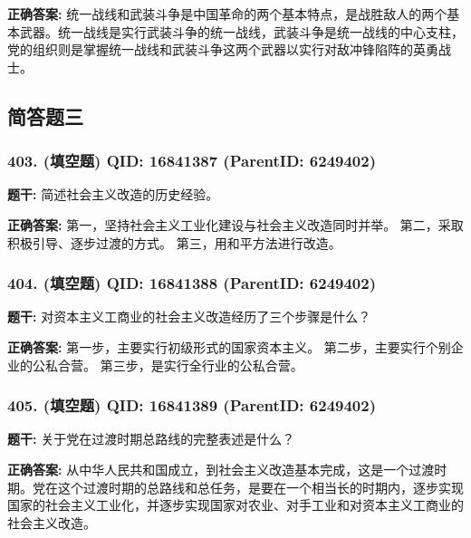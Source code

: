 \documentclass[12pt,UTF8]{ctexart}
\begin{document}
\textbf{正确答案:}
统一战线和武装斗争是中国革命的两个基本特点，是战胜敌人的两个基本武器。统一战线是实行武装斗争的统一战线，武装斗争是统一战线的中心支柱，党的组织则是掌握统一战线和武装斗争这两个武器以实行对敌冲锋陷阵的英勇战士。

\vspace{0.3em}\hrulefill\vspace{0.7em}

\subsection*{简答题三}

\subsubsection*{403. (填空题) \small QID: 16841387 (ParentID: 6249402)}

\textbf{题干:}
简述社会主义改造的历史经验。



\textbf{正确答案:}
第一，坚持社会主义工业化建设与社会主义改造同时并举。
第二，采取积极引导、逐步过渡的方式。
第三，用和平方法进行改造。

\vspace{0.3em}\hrulefill\vspace{0.7em}

\subsubsection*{404. (填空题) \small QID: 16841388 (ParentID: 6249402)}

\textbf{题干:}
对资本主义工商业的社会主义改造经历了三个步骤是什么？



\textbf{正确答案:}
第一步，主要实行初级形式的国家资本主义。
第二步，主要实行个别企业的公私合营。
第三步，是实行全行业的公私合营。

\vspace{0.3em}\hrulefill\vspace{0.7em}

\subsubsection*{405. (填空题) \small QID: 16841389 (ParentID: 6249402)}

\textbf{题干:}
关于党在过渡时期总路线的完整表述是什么？



\textbf{正确答案:}
从中华人民共和国成立，到社会主义改造基本完成，这是一个过渡时期。党在这个过渡时期的总路线和总任务，是要在一个相当长的时期内，逐步实现国家的社会主义工业化，并逐步实现国家对农业、对手工业和对资本主义工商业的社会主义改造。
\end{document}

